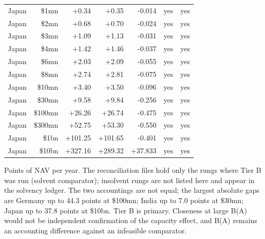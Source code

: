 \begin{table}[t]
\begin{tabular}{lrrrrrr}
Japan & \$1mn & +0.34 & +0.35 & -0.014 & yes & yes \\
Japan & \$2mn & +0.68 & +0.70 & -0.024 & yes & yes \\
Japan & \$3mn & +1.09 & +1.13 & -0.031 & yes & yes \\
Japan & \$4mn & +1.42 & +1.46 & -0.037 & yes & yes \\
Japan & \$6mn & +2.03 & +2.09 & -0.055 & yes & yes \\
Japan & \$8mn & +2.74 & +2.81 & -0.075 & yes & yes \\
Japan & \$10mn & +3.40 & +3.50 & -0.096 & yes & yes \\
Japan & \$30mn & +9.58 & +9.84 & -0.256 & yes & yes \\
Japan & \$100mn & +26.26 & +26.74 & -0.475 & yes & yes \\
Japan & \$300mn & +52.75 & +53.30 & -0.550 & yes & yes \\
Japan & \$1bn & +101.25 & +101.65 & -0.401 & yes & yes \\
Japan & \$10bn & +327.16 & +289.32 & +37.833 & yes & yes \\
\bottomrule
\end{tabular}
\par\vspace{2pt}
\parbox{\textwidth}{\footnotesize Points of NAV per year. The reconciliation files hold only the rungs where Tier B was run (solvent comparator); insolvent rungs are not listed here and appear in the solvency ledger. The two accountings are not equal; the largest absolute gaps are Germany up to 44.3 points at \$100mn; India up to 7.0 points at \$30mn; Japan up to 37.8 points at \$10bn. Tier B is primary. Closeness at large B(A) would not be independent confirmation of the capacity effect, and B(A) remains an accounting difference against an infeasible comparator.}
\end{table}
